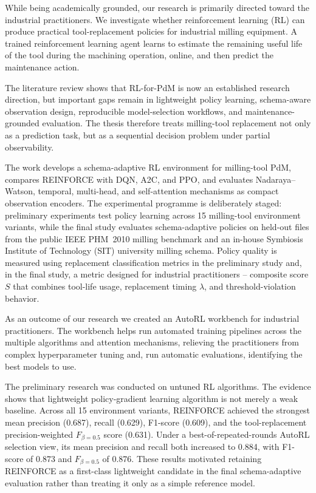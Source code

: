 \documentclass[12pt,oneside]{book}
\begin{document}
While being academically grounded, our research is primarily directed toward the industrial practitioners. We investigate whether reinforcement learning (RL) can produce practical tool-replacement policies for industrial milling equipment. A trained reinforcement learning agent learns to estimate the remaining useful life of the tool during the machining operation, online, and then predict the maintenance action. 

The literature review shows that RL-for-PdM is now an established research direction, but important gaps remain in lightweight policy learning, schema-aware observation design, reproducible model-selection workflows, and maintenance-grounded evaluation. The thesis therefore treats milling-tool replacement not only as a prediction task, but as a sequential decision problem under partial observability.

The work develops a schema-adaptive RL environment for milling-tool PdM, compares \textsc{REINFORCE} with DQN, A2C, and PPO, and evaluates Nadaraya--Watson, temporal, multi-head, and self-attention mechanisms as compact observation encoders. The experimental programme is deliberately staged: preliminary experiments test policy learning across 15 milling-tool environment variants, while the final study evaluates schema-adaptive policies on held-out files from the public IEEE PHM~2010 milling benchmark and an in-house Symbiosis Institute of Technology (SIT) university milling schema. Policy quality is measured using replacement classification metrics in the preliminary study and, in the final study, a metric designed for industrial practitioners -- composite score $S$ that combines tool-life usage, replacement timing $\lambda$, and threshold-violation behavior.

As an outcome of our research we created an AutoRL workbench for industrial practitioners. The workbench helps run automated training pipelines across the multiple algorithms and attention mechanisms, relieving the practitioners from complex hyperparameter tuning and, run automatic evaluations, identifying the best models to use.

The preliminary research was conducted on untuned RL algorithms. The evidence shows that lightweight policy-gradient learning algorithm is not merely a weak baseline. Across all 15 environment variants, \textsc{REINFORCE} achieved the strongest mean precision (0.687), recall (0.629), F1-score (0.609), and the tool-replacement precision-weighted $F_{\beta=0.5}$ score (0.631). Under a best-of-repeated-rounds AutoRL selection view, its mean precision and recall both increased to 0.884, with F1-score of 0.873 and $F_{\beta=0.5}$ of 0.876. These results motivated retaining \textsc{REINFORCE} as a first-class lightweight candidate in the final schema-adaptive evaluation rather than treating it only as a simple reference model.
\end{document}
